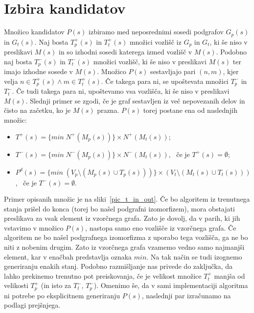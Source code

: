 \documentclass[a4paper, 12pt, ]{book}
\begin{document}
	\section{Izbira kandidatov}
	\label{vf2:candidate}
	
	Množico kandidatov $P(s)$ izbiramo med neposrednimi sosedi podgrafov $G_p(s)$ in $G_t(s)$. Naj bosta $T_p^+(s)$ in $T_t^+(s)$ množici vozlišč iz
	$G_p$ in $G_t$, ki še niso v preslikavi $M(s)$ in so izhodni sosedi katerega izmed vozlišč v $M(s)$. Podobno naj bosta $T_p^-(s)$ in $T_t^-(s)$ množici
	vozlišč, ki še niso v preslikavi $M(s)$ ter imajo izhodne sosede v $M(s)$. Množico $P(s)$ sestavljajo pari $(n,m)$, kjer velja $n \in T_p^+(s) \wedge
	m \in T_t^+(s)$. Če takega para ni, se upoštevata množici $T_p^-$ in $T_t^-$. Če tudi takega para ni, upoštevamo vsa vozlišča, ki še niso v preslikavi
	$M(s)$. Slednji primer se zgodi, če je graf sestavljen iz več nepovezanih delov in čisto na začetku, ko je $M(s)$ prazna. $P(s)$ torej postane ena od
	naslednjih množic:
	\begin{itemize}
	\item $T^+(s) = \{min\; N^+(M_p(s))\} \times N^+(M_t(s))$;
	\item $T^-(s) = \{min\; N^-(M_p(s))\} \times N^-(M_t(s))$, \, če je $T^+(s) = \emptyset$;
	\item $P^d(s) = \{min\; (V_p \setminus (M_p(s) \cup T_p(s))) \}  \times (V_t \setminus (M_t(s) \cup T_t(s)) )$, \, če je $T^-(s) = \emptyset$.
	\end{itemize}
	
	Primer opisanih množic je na sliki~\ref{pic_t_in_out}. Če bo algoritem iz trenutnega stanja prišel do konca (torej bo našel podgrafni izomorfizem), mora
	obstajati preslikava za vsak element iz vzorčnega grafa. Zato je dovolj, da v parih, ki jih vstavimo v množico $P(s)$, nastopa samo eno vozlišče iz
	vzorčnega grafa. Če algoritem ne bo našel podgrafnega izomorfizma z uporabo tega vozlišča, ga ne bo niti z nobenim drugim. Zato iz vzorčnega grafa 
	vzamemo vedno samo najmanjši element, kar v enačbah predstavlja oznaka $min$. Na tak način se tudi izognemo generiranju enakih stanj. Podobno 
	razmišljanje nas privede do zaključka, da lahko prekinemo trenutno pot preiskovanja, če je velikost množice $T_t^+$ manjša od velikosti $T_p^+$
	(in isto za $T_t^-$, $T_p^-$). Omenimo še, da v sami implementaciji algoritma ni potrebe po eksplicitnem generiranju $P(s)$, naslednji par izračunamo
	na podlagi prejšnjega.
	
\end{document}
